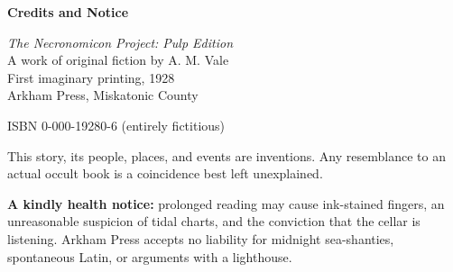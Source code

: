 \thispagestyle{empty}
\vspace*{\fill}
\begin{center}
  {\Large\bfseries Credits and Notice\par}
  \vspace{1em}
  \textit{The Necronomicon Project: Pulp Edition}\\
  A work of original fiction by A. M. Vale\\
  First imaginary printing, 1928\\
  Arkham Press, Miskatonic County

  \vspace{1.5em}
  ISBN 0-000-19280-6 (entirely fictitious)

  \vspace{1.5em}
  This story, its people, places, and events are inventions. Any resemblance
  to an actual occult book is a coincidence best left unexplained.

  \vspace{1.5em}
  \textbf{A kindly health notice:} prolonged reading may cause ink-stained
  fingers, an unreasonable suspicion of tidal charts, and the conviction that
  the cellar is listening. Arkham Press accepts no liability for midnight
  sea-shanties, spontaneous Latin, or arguments with a lighthouse.
\end{center}
\vspace*{\fill}
\clearpage
